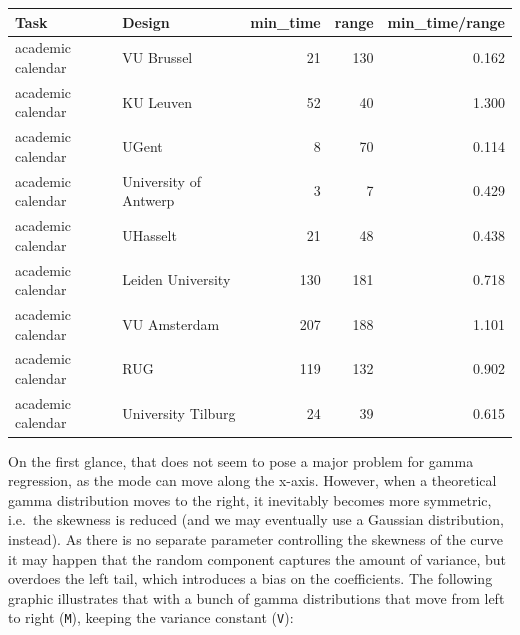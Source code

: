 \documentclass[]{svmono}
\begin{document}
\begin{tabular}{l|l|r|r|r}
\hline
Task & Design & min\_time & range & min\_time/range\\
\hline
academic calendar & VU Brussel & 21 & 130 & 0.162\\
\hline
academic calendar & KU Leuven & 52 & 40 & 1.300\\
\hline
academic calendar & UGent & 8 & 70 & 0.114\\
\hline
academic calendar & University of Antwerp & 3 & 7 & 0.429\\
\hline
academic calendar & UHasselt & 21 & 48 & 0.438\\
\hline
academic calendar & Leiden University & 130 & 181 & 0.718\\
\hline
academic calendar & VU Amsterdam & 207 & 188 & 1.101\\
\hline
academic calendar & RUG & 119 & 132 & 0.902\\
\hline
academic calendar & University Tilburg & 24 & 39 & 0.615\\
\hline
\end{tabular}

On the first glance, that does not seem to pose a major problem for
gamma regression, as the mode can move along the x-axis. However, when a
theoretical gamma distribution moves to the right, it inevitably becomes
more symmetric, i.e.~the skewness is reduced (and we may eventually use
a Gaussian distribution, instead). As there is no separate parameter
controlling the skewness of the curve it may happen that the random
component captures the amount of variance, but overdoes the left tail,
which introduces a bias on the coefficients. The following graphic
illustrates that with a bunch of gamma distributions that move from left
to right (\texttt{M}), keeping the variance constant (\texttt{V}):
\end{document}
